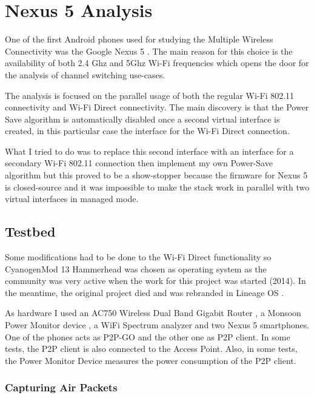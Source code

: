 \chapter{Nexus 5 Analysis}

One of the first Android phones used for studying the Multiple Wireless Connectivity was the Google Nexus 5 \cite{cite-nexus5}. The main reason for this choice is the availability of both 2.4 Ghz and 5Ghz Wi-Fi frequencies which opens the door for the analysis of channel switching use-cases. 

The analysis is focused on the parallel usage of both the regular Wi-Fi 802.11 connectivity and Wi-Fi Direct connectivity. The main discovery is that the Power Save algorithm is automatically disabled once a second virtual interface is created, in this particular case the interface for the Wi-Fi Direct connection. 

What I tried to do was to replace this second interface with an interface for a secondary Wi-Fi 802.11 connection then implement my own Power-Save algorithm but this proved to be a show-stopper because the firmware for Nexus 5 is closed-source and it was impossible to make the stack work in parallel with two virtual interfaces in managed mode.


\section{Testbed}
\label{sec:testbed}

Some modifications had to be done to the Wi-Fi Direct functionality so CyanogenMod 13 Hammerhead was chosen as operating system as the community was very active when the work for this project was started (2014). In the meantime, the original project died and was rebranded in Lineage OS \cite{cite-lineage}.

As hardware I used an AC750 Wireless Dual Band Gigabit Router \cite{cite-router}, a Monsoon Power Monitor device \cite{cite-monsoon}, a WiFi Spectrum analyzer and two Nexus 5 smartphones. One of the phones acts as P2P-GO and the other one as P2P client. In some tests, the P2P client is also connected to the Access Point. Also, in some tests, the Power Monitor Device measures the power consumption of the P2P client.

\subsection{Capturing Air Packets}
\label{sub-sec:proj-scopemonitormode}

